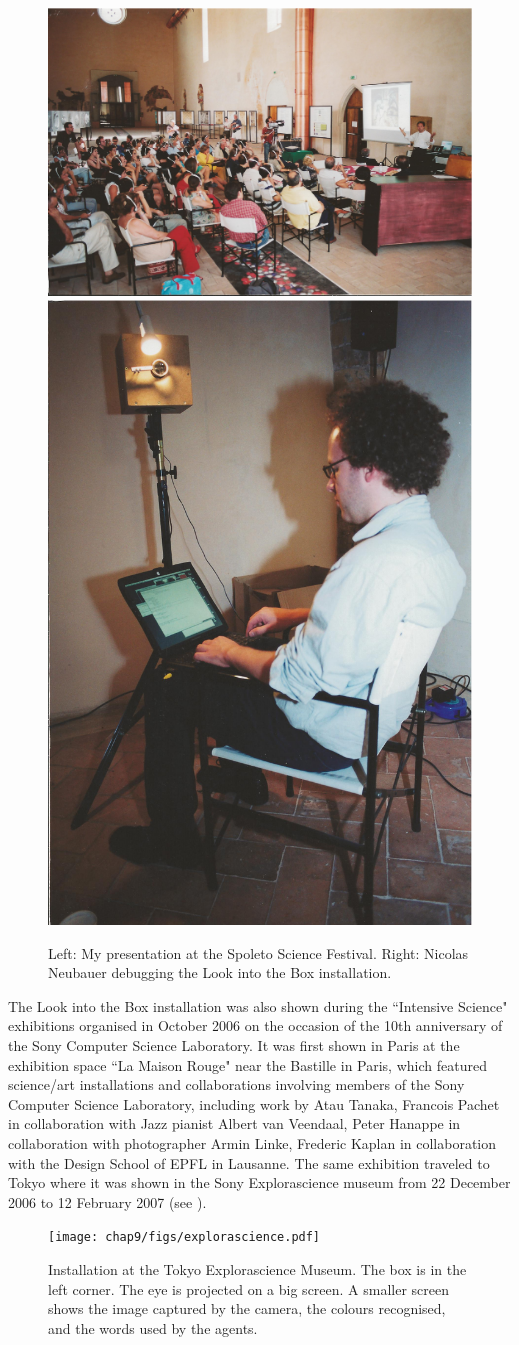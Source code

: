 \begin{figure}[htbp]
  \centerline{\includegraphics[width=.65\textwidth]{chap9/figs/ital-talk.pdf}
\includegraphics[width=.30\textwidth]{chap9/figs/ital2.pdf}}
\caption{\label{fig:spoleto}Left: My presentation at the Spoleto Science Festival. Right: Nicolas Neubauer debugging 
the Look into the Box installation.
 }
\end{figure}

The Look into the Box installation was also shown during the ``Intensive Science" exhibitions organised in October 
2006 on the occasion of the 10th anniversary of the Sony Computer Science Laboratory.
It was first shown in Paris at 
the exhibition space ``La Maison Rouge" near the Bastille in Paris, which featured science/art installations 
and collaborations involving members of the Sony Computer Science Laboratory, including work by Atau Tanaka, 
Francois Pachet in collaboration with Jazz pianist Albert van Veendaal, Peter Hanappe in collaboration with 
photographer Armin Linke, Frederic Kaplan in collaboration with the Design School of EPFL in Lausanne. 
The same exhibition traveled to Tokyo where it was shown in the Sony Explorascience museum from 22 December 2006 
to 12 February 2007 (see ). 
\begin{figure}[htbp]
  \centerline{\texttt{[image: chap9/figs/explorascience.pdf]}}
\caption{\label{fig:intensive-science}Installation at the Tokyo Explorascience Museum. The box is in the left corner. The eye is projected on a 
big screen. A smaller screen shows the image captured by the camera, the colours recognised, and the words used by 
the agents.}
\end{figure}
